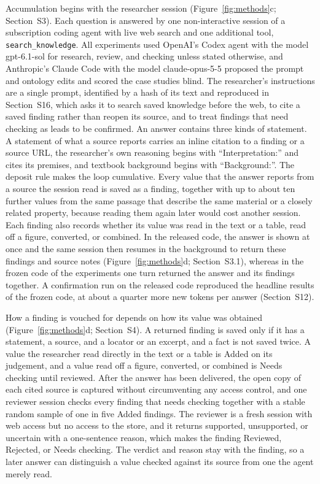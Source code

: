 \documentclass[journal=mamobx,manuscript=article]{achemso}
\newcommand{\code}[1]{\texttt{#1}}
\begin{document}
Accumulation begins with the researcher session (Figure~\ref{fig:methods}c; Section~S3).
Each question is answered by one non-interactive session of a subscription coding agent with live web search and one additional tool, \code{search\_knowledge}.
All experiments used OpenAI's Codex agent with the model gpt-6.1-sol for research, review, and checking unless stated otherwise, and Anthropic's Claude Code with the model claude-opus-5-5 proposed the prompt and ontology edits and scored the case studies blind.
The researcher's instructions are a single prompt, identified by a hash of its text and reproduced in Section~S16, which asks it to search saved knowledge before the web, to cite a saved finding rather than reopen its source, and to treat findings that need checking as leads to be confirmed.
An answer contains three kinds of statement.
A statement of what a source reports carries an inline citation to a finding or a source URL, the researcher's own reasoning begins with ``Interpretation:'' and cites its premises, and textbook background begins with ``Background:''.
The deposit rule makes the loop cumulative.
Every value that the answer reports from a source the session read is saved as a finding, together with up to about ten further values from the same passage that describe the same material or a closely related property, because reading them again later would cost another session.
Each finding also records whether its value was read in the text or a table, read off a figure, converted, or combined.
In the released code, the answer is shown at once and the same session then resumes in the background to return these findings and source notes (Figure~\ref{fig:methods}d; Section~S3.1), whereas in the frozen code of the experiments one turn returned the answer and its findings together.
A confirmation run on the released code reproduced the headline results of the frozen code, at about a quarter more new tokens per answer (Section~S12).

How a finding is vouched for depends on how its value was obtained (Figure~\ref{fig:methods}d; Section~S4).
A returned finding is saved only if it has a statement, a source, and a locator or an excerpt, and a fact is not saved twice.
A value the researcher read directly in the text or a table is Added on its judgement, and a value read off a figure, converted, or combined is Needs checking until reviewed.
After the answer has been delivered, the open copy of each cited source is captured without circumventing any access control, and one reviewer session checks every finding that needs checking together with a stable random sample of one in five Added findings.
The reviewer is a fresh session with web access but no access to the store, and it returns supported, unsupported, or uncertain with a one-sentence reason, which makes the finding Reviewed, Rejected, or Needs checking.
The verdict and reason stay with the finding, so a later answer can distinguish a value checked against its source from one the agent merely read.
\end{document}
